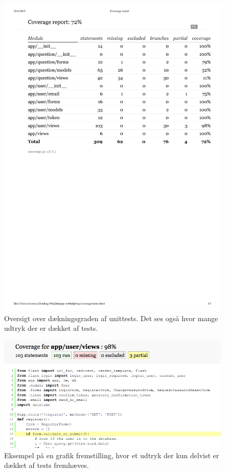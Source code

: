\documentclass[11pt, a4paper]{article}
\begin{document}
\begin{figure}[h]
    \centering
    \includegraphics[width=0.8\linewidth]{figures/testcoverage.pdf}
    \caption{Oversigt over dækningsgraden af unittests. Det ses også hvor mange udtryk der er dækket af tests.}
    \label{fig:testcoverage}
\end{figure}

\begin{figure}[h]
    \centering
    \includegraphics[width=0.8\linewidth]{figures/code_coverage.png}
    \caption{Eksempel på en grafik fremstilling, hvor et udtryk der kun delvist er dækket af tests fremhæves.}
    \label{fig:code_coverage}
\end{figure}
\end{document}
